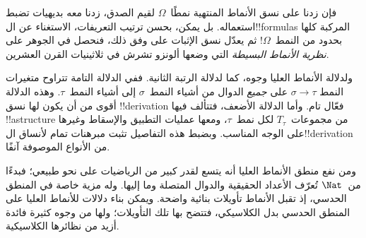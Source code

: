 \documentclass[../../../include/open-logic-section]{subfiles}
\begin{document}
فإن زدنا على نسق الأنماط المنتهية نمطًا~$\Omega$ لقيم الصدق،
زدنا معه بديهيات تضبط استعماله. بل يمكن، بحسن ترتيب التعريفات،
الاستغناء عن ال!!{formula}s المركبة كلها بحدود من النمط~$\Omega$!{}
ثم يعدّل نسق الإثبات على وفق ذلك، فنحصل في الجوهر على
\emph{نظرية الأنماط البسيطة} التي وضعها ألونزو تشرش في
ثلاثينيات القرن العشرين.

ولدلالة الأنماط العليا وجوه، كما لدلالة الرتبة الثانية.
ففي الدلالة التامة تتراوح متغيرات النمط $\sigma
\to \tau$ على \emph{جميع} الدوال من أشياء النمط~$\sigma$
إلى أشياء النمط~$\tau$. وهذه الدلالة أقوى من أن يكون لها
نسق !!{derivation} فعّال تام. وأما الدلالة الأضعف، فتتألف فيها
!!a{structure} من مجموعات~$T_\tau$ لكل نمط~$\tau$، ومعها
عمليات التطبيق والإسقاط وغيرها على الوجه المناسب. وبضبط هذه
التفاصيل تثبت مبرهنات تمام لأنساق ال!!{derivation} من الأنواع
الموصوفة آنفًا.

ومن نفع منطق الأنماط العليا أنه يتسع لقدر كبير من الرياضيات
على نحو طبيعي؛ فبدءًا من~$\Nat$ تُعرّف الأعداد الحقيقية والدوال
المتصلة وما إليها. وله مزية خاصة في المنطق الحدسي، إذ تقبل
الأنماط تأويلات بنائية واضحة. ويمكن بناء دلالات للأنماط العليا
على المنطق الحدسي بدل الكلاسيكي، فتتضح بها تلك التأويلات؛ ولها
من وجوه كثيرة فائدة أزيد من نظائرها الكلاسيكية.
\end{document}

